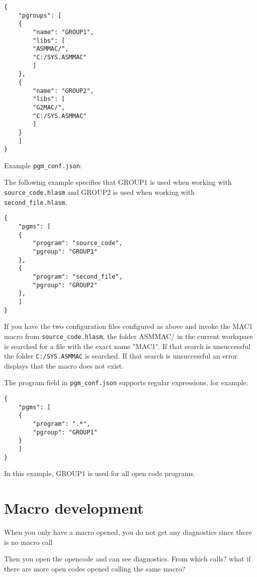 	\begin{verbatim}
{
    "pgroups": [
	{
		"name": "GROUP1",
		"libs": [
		"ASMMAC/",
		"C:/SYS.ASMMAC"
		]
	},
	{
		"name": "GROUP2",
		"libs": [
		"G2MAC/",
		"C:/SYS.ASMMAC"
		]
	}
	]
}
	\end{verbatim}



Example \texttt{pgm\_conf.json}:

The following example specifies that GROUP1 is used when working with \texttt{source\_code.hlasm} and GROUP2 is used when working with \texttt{second\_file.hlasm}.

	\begin{verbatim}
{
	"pgms": [
	{
		"program": "source_code",
		"pgroup": "GROUP1"
	},
	{
		"program": "second_file",
		"pgroup": "GROUP2"
	},
	]
}
	\end{verbatim}


If you have the two configuration files configured as above and invoke the MAC1 macro from \texttt{source\_code.hlasm}, the folder ASMMAC/ in the current workspace is searched for a file with the exact name "MAC1". If that search is unsuccessful the folder \texttt{C:/SYS.ASMMAC} is searched. If that search is unsuccessful an error displays that the macro does not exist.

The program field in \texttt{pgm\_conf.json} supports regular expressions, for example:

	\begin{verbatim}
{
	"pgms": [
	{
		"program": ".*",
		"pgroup": "GROUP1"
	}
	]
}
	\end{verbatim}


In this example, GROUP1 is used for all open code programs.

\section{Macro development}

When you only have a macro opened, you do not get any diagnostics since there is no macro call

Then you open the opencode and can see diagnostics. From which calls? what if there are more open codes opened calling the same macro?

